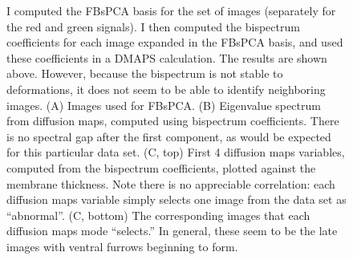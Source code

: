 \documentclass{pnastwo}
\begin{document}
\begin{figure}[t]
\caption{I computed the FBsPCA basis for the set of images (separately for the red and green signals).
%
I then computed the bispectrum coefficients for each image expanded in the FBsPCA basis, and used these coefficients in a DMAPS calculation.
%
The results are shown above.
%
However, because the bispectrum is not stable to deformations, it does not seem to be able to identify neighboring images.
%
(A) Images used for FBsPCA. (B) Eigenvalue spectrum from diffusion maps, computed using bispectrum coefficients. There is no spectral gap after the first component, as would be expected for this particular data set. (C, top) First 4 diffusion maps variables, computed from the bispectrum coefficients, plotted against the membrane thickness. Note there is no appreciable correlation: each diffusion maps variable simply selects one image from the data set as ``abnormal''. (C, bottom) The corresponding images that each diffusion maps mode ``selects.'' In general, these seem to be the late images with ventral furrows beginning to form. }
\end{figure}
\end{document}

